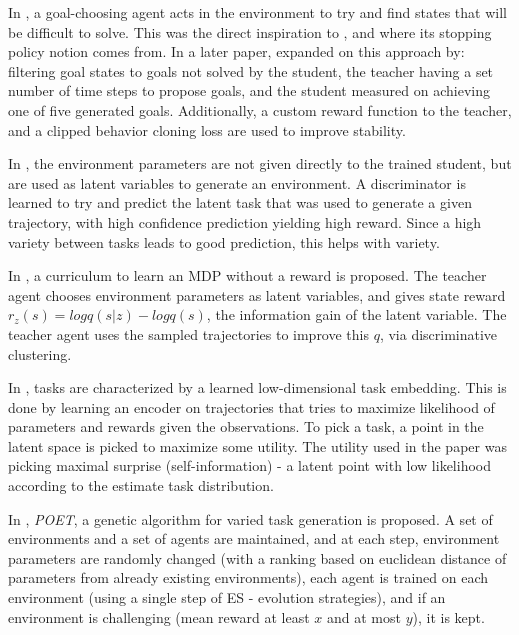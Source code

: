 \documentclass[letterpaper]{article}
\theoremstyle{definition}
\begin{document}
In \cite{Sukhbaatar2017}, a goal-choosing agent acts in the environment to try and find states that will be difficult to solve. This was the direct inspiration to \cite{Raparthy2020}, and where its stopping policy notion comes from. In a later paper, \cite{OpenAI2021} expanded on this approach by: filtering goal states to goals not solved by the student, the teacher having a set number of time steps to propose goals, and the student measured on achieving one of five generated goals. Additionally, a custom reward function to the teacher, and a clipped behavior cloning loss are used to improve stability.

In \cite{Gupta2018}, the environment parameters are not given directly to the trained student, but are used as latent variables to generate an environment. A discriminator is learned to try and predict the latent task that was used to generate a given trajectory, with high confidence prediction yielding high reward. Since a high variety between tasks leads to good prediction, this helps with variety.

In \cite{Jabri2019}, a curriculum to learn an MDP without a reward is proposed. The teacher agent chooses environment parameters as latent variables, and gives state reward $r_z(s) = log q(s|z) - log q(s)$, the information gain of the latent variable. The teacher agent uses the sampled trajectories to improve this $q$, via discriminative clustering.

In \cite{Kaddour2020}, tasks are characterized by a learned low-dimensional task embedding. This is done by learning an encoder on trajectories that tries to maximize likelihood of parameters and rewards given the observations. To pick a task, a point in the latent space is picked to maximize some utility.
The utility used in the paper was picking maximal surprise (self-information) - a latent point with low likelihood according to the estimate task distribution.

In \cite{Wang2019}, \textit{POET}, a genetic algorithm for varied task generation is proposed. A set of environments and a set of agents are maintained, and at each step, environment parameters are randomly changed (with a ranking based on euclidean distance of parameters from already existing environments), each agent is trained on each environment (using a single step of ES - evolution strategies), and if an environment is challenging (mean reward at least $x$ and at most $y$), it is kept.

\end{document}
